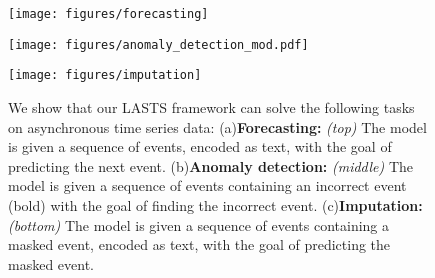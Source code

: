 





\begin{figure}[ht]
\centering
\begin{minipage}[b]{\columnwidth}
\centering
    \texttt{[image: figures/forecasting]}
    \label{fig:intro_forecasting}
\end{minipage} 
\begin{minipage}[b]{\columnwidth}
\centering
    \texttt{[image: figures/anomaly\_detection\_mod.pdf]}
    \label{fig:intro_anomaly_detection}
\end{minipage}
\begin{minipage}[b]{\columnwidth}
\centering
    \texttt{[image: figures/imputation]}
    \label{fig:intro_imputation}
\end{minipage}
\caption{We show that our LASTS framework can solve the following tasks on asynchronous time series data: (a)\textbf{Forecasting:} \textit{(top)} The model is given a sequence of events, encoded as text, with the goal of predicting the next event. (b)\textbf{Anomaly detection:} \textit{(middle)} The model is given a sequence of events containing an incorrect event (bold) with the goal of finding the incorrect event. (c)\textbf{Imputation: }\textit{(bottom)} The model is given a sequence of events containing a masked event, encoded as text, with the goal of predicting the masked event.}

\label{fig:overall}
\end{figure}

